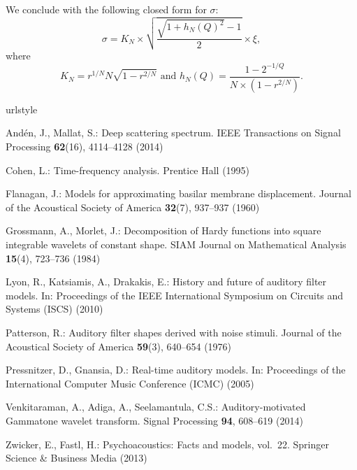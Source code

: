 \documentclass[smallextended]{svjour3}
\begin{document}
We conclude with the following closed form for $\sigma$:
\[
\sigma=K_{N}\times\sqrt{\dfrac{\sqrt{1+h_{N}\left(Q\right)^{2}}-1}{2}}\times\xi,
\]
where
\[
K_{N}=r^{1/N}N\sqrt{1-r^{2/N}}\mbox{ and }h_{N}\left(Q\right)=\dfrac{1-2^{-1/Q}}{N\times\left(1-r^{2/N}\right)}.
\]



\begin{thebibliography}{10}
\providecommand{\url}[1]{{#1}}
\providecommand{\urlprefix}{URL }
\expandafter\ifx\csname urlstyle\endcsname\relax
  \providecommand{\doi}[1]{DOI~\discretionary{}{}{}#1}\else
  \providecommand{\doi}{DOI~\discretionary{}{}{}\begingroup
  \urlstyle{rm}\Url}\fi


And{\'e}n, J., Mallat, S.: Deep scattering spectrum.
\newblock IEEE Transactions on Signal Processing \textbf{62}(16), 4114--4128
  (2014)

Cohen, L.: Time-frequency analysis.
\newblock Prentice Hall (1995)

Flanagan, J.: Models for approximating basilar membrane displacement.
\newblock Journal of the Acoustical Society of America \textbf{32}(7), 937--937
  (1960)

Grossmann, A., Morlet, J.: {Decomposition of Hardy functions into square
  integrable wavelets of constant shape}.
\newblock SIAM Journal on Mathematical Analysis \textbf{15}(4), 723--736 (1984)


Lyon, R., Katsiamis, A., Drakakis, E.: History and future of auditory filter
  models.
\newblock In: Proceedings of the IEEE International Symposium on Circuits and
  Systems (ISCS) (2010)

Patterson, R.: Auditory filter shapes derived with noise stimuli.
\newblock Journal of the Acoustical Society of America \textbf{59}(3), 640--654
  (1976)

Pressnitzer, D., Gnansia, D.: Real-time auditory models.
\newblock In: Proceedings of the International Computer Music Conference (ICMC)
  (2005)


Venkitaraman, A., Adiga, A., Seelamantula, C.S.: {Auditory-motivated Gammatone
  wavelet transform}.
\newblock Signal Processing \textbf{94}, 608--619 (2014)


Zwicker, E., Fastl, H.: Psychoacoustics: Facts and models, vol.~22.
\newblock Springer Science \& Business Media (2013)







\end{thebibliography}
\end{document}
